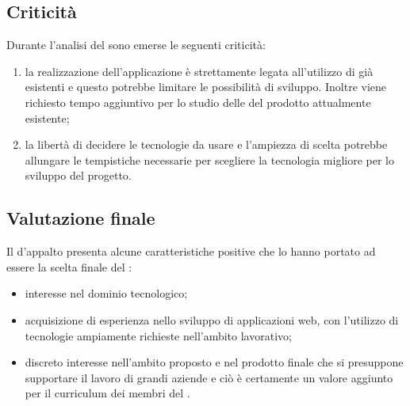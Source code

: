 \subsection {Criticità}
Durante l'analisi del  sono emerse le seguenti criticità:
\begin{enumerate}
	\item la realizzazione dell'applicazione è strettamente legata all'utilizzo di  già esistenti e questo potrebbe limitare le possibilità di sviluppo. Inoltre viene richiesto tempo aggiuntivo per lo studio delle  del prodotto attualmente esistente;
	\item la libertà di decidere le tecnologie da usare e l'ampiezza di scelta potrebbe allungare le tempistiche necessarie per scegliere la tecnologia migliore per lo sviluppo del progetto. %
\end{enumerate}


\subsection {Valutazione finale}

Il  d'appalto presenta alcune caratteristiche positive che lo hanno portato ad essere la scelta finale del :
\begin{itemize}
	\item interesse nel dominio tecnologico;
	\item acquisizione di esperienza nello sviluppo di applicazioni web, con l'utilizzo di tecnologie ampiamente richieste nell’ambito lavorativo;
	\item discreto interesse nell'ambito proposto e nel prodotto finale che si presuppone supportare il lavoro di grandi aziende e ciò è certamente un valore aggiunto per il curriculum dei membri del .

\end{itemize}
